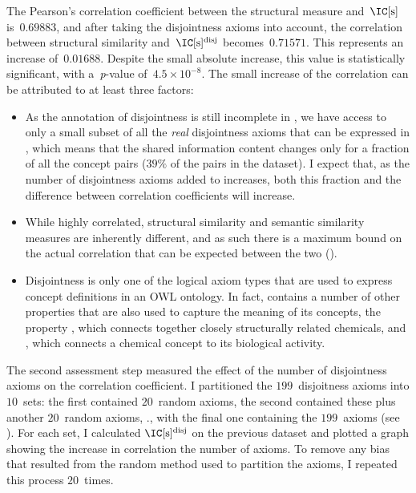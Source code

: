 The Pearson's correlation coefficient between the structural measure and~$\ICs$ is~$0.69883$, and after taking the disjointness axioms into account, the correlation between structural similarity and~$\ICsdis$ becomes~$0.71571$. This represents an increase of~$0.01688$. Despite the small absolute increase, this value is statistically significant, with a~\emph{p}-value of~$4.5 \times 10^{-8}$. The small increase of the correlation can be attributed to at least three
factors:
\begin{itemize}
    \item As the annotation of disjointness is still incomplete in , we have access to only a small subset of all the \emph{real} disjointness axioms that can be expressed in , which means that the shared information content changes only for a fraction of all the concept pairs ($39\%$ of the pairs in the dataset). I expect that, as the number of disjointness axioms added to  increases, both this fraction and the difference between correlation coefficients will increase.
    \item While highly correlated, structural similarity and semantic similarity measures are inherently different, and as such there is a maximum bound on the actual correlation that can be expected between the two (\cf {}).
    \item Disjointness is only one of the logical axiom types that are used to express concept definitions in an OWL ontology. In fact,  contains a number of other properties that are also used to capture the meaning of its concepts, \eg the property , which connects together closely structurally related chemicals, and , which connects a chemical concept to its biological activity.
\end{itemize}


 The second assessment step measured the effect of the number of disjointness axioms on the correlation coefficient. I partitioned the $199$~disjoitness axioms into $10$~sets: the first contained $20$~random axioms, the second contained these plus another $20$~random axioms, \etc., with the final one containing the $199$~axioms (see ). For each set, I calculated $\ICsdis$ on the previous dataset and plotted a graph showing the increase in correlation \vs the number of axioms. To remove any bias that resulted from the random method used to partition the axioms, I repeated this process $20$~times.


